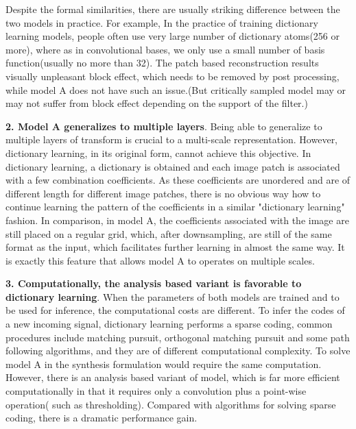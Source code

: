 \documentclass[a4paper]{article}
\begin{document}
{Despite the formal similarities, there are usually striking difference between the two models in practice. For example, In the practice of training dictionary learning models, people often use very large number of dictionary atoms(256 or more), where as in convolutional bases, we only use a small number of basis function(usually no more than 32). The patch based reconstruction results visually unpleasant block effect, which needs to be removed by post processing, while model A does not have such an issue.(But critically sampled model may or may not suffer from block effect depending on the support of the filter.)

\textbf{2. Model A generalizes to multiple layers}. Being able to generalize to multiple layers of transform is crucial to a multi-scale representation. However, dictionary learning, in its original form, cannot achieve this objective. In dictionary learning, a dictionary is obtained and each image patch is associated with a few combination coefficients. As these coefficients are unordered and are of different length for different image patches, there is no obvious way how to continue learning the pattern of the coefficients in a similar "dictionary learning" fashion. In comparison, in model A, the coefficients associated with the image are still placed on a regular grid, which, after downsampling, are still of the same format as the input, which facilitates further learning in almost the same way. It is exactly this feature that allows model A to operates on multiple scales. 

\textbf{3. Computationally, the analysis based variant is favorable to dictionary learning}. When the parameters of both models are trained and to be used for inference, the computational costs are different. To infer the codes of a new incoming signal, dictionary learning performs a sparse coding, common procedures include matching pursuit, orthogonal matching pursuit and some path following algorithms, and they are of  different computational complexity. To solve model A in the synthesis formulation would require the same computation. However, there is an analysis based variant of model, which is far more efficient computationally in that it requires only a convolution plus a point-wise operation( such as thresholding). Compared with algorithms for solving sparse coding, there is a dramatic performance gain.
\newpage
{\color{cyan}
}}
\end{document}
